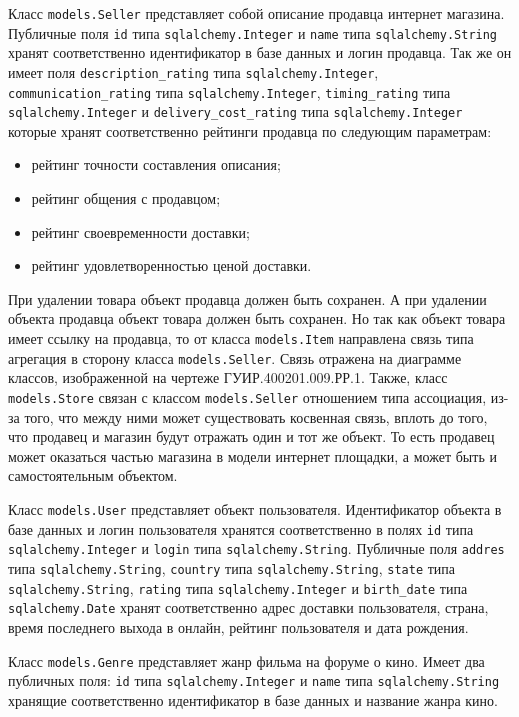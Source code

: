 Класс \texttt{models.Seller} представляет собой описание продавца интернет магазина. Публичные поля \texttt{id} типа \texttt{sqlalchemy.Integer} и \texttt{name} типа \texttt{sqlalchemy.String} хранят соответственно идентификатор в базе данных и логин продавца. Так же он имеет поля \texttt{description\_rating} типа \texttt{sqlalchemy.Integer}, \texttt{communication\_rating} типа \texttt{sqlalchemy.Integer}, \texttt{timing\_rating} типа \texttt{sqlalchemy.Integer} и \texttt{delivery\_cost\_rating} типа \texttt{sqlalchemy.Integer} которые хранят соответственно рейтинги продавца по следующим параметрам:
\begin{itemize}
\item рейтинг точности составления описания;
\item рейтинг общения с продавцом;
\item рейтинг своевременности доставки;
\item рейтинг удовлетворенностью ценой доставки.
\end{itemize}
При удалении товара объект продавца должен быть сохранен. А при удалении объекта продавца объект товара должен быть сохранен. Но так как объект товара имеет ссылку на продавца, то от класса \texttt{models.Item} направлена связь типа агрегация в сторону класса \texttt{models.Seller}. Связь отражена на диаграмме классов, изображенной на чертеже ГУИР.400201.009.РР.1. Также, класс \texttt{models.Store} связан с классом \texttt{models.Seller} отношением типа ассоциация, из-за того, что между ними может существовать косвенная связь, вплоть до того, что продавец и магазин будут отражать один и тот же объект. То есть продавец может оказаться частью магазина в модели интернет площадки, а может быть и самостоятельным объектом.

Класс \texttt{models.User} представляет объект пользователя. Идентификатор объекта в базе данных и логин пользователя хранятся соответственно в полях \texttt{id} типа \texttt{sqlalchemy.Integer} и \texttt{login} типа \texttt{sqlalchemy.String}. Публичные поля \texttt{addres} типа \texttt{sqlalchemy.String}, \texttt{country} типа \texttt{sqlalchemy.String}, \texttt{state} типа \texttt{sqlalchemy.String}, \texttt{rating} типа \texttt{sqlalchemy.Integer} и \texttt{birth\_date} типа \texttt{sqlalchemy.Date} хранят соответственно адрес доставки пользователя, страна, время последнего выхода в онлайн, рейтинг пользователя и дата рождения.

Класс \texttt{models.Genre} представляет жанр фильма на форуме о кино. Имеет два публичных поля: \texttt{id} типа \texttt{sqlalchemy.Integer} и \texttt{name} типа \texttt{sqlalchemy.String} хранящие соответственно идентификатор в базе данных и название жанра кино.

